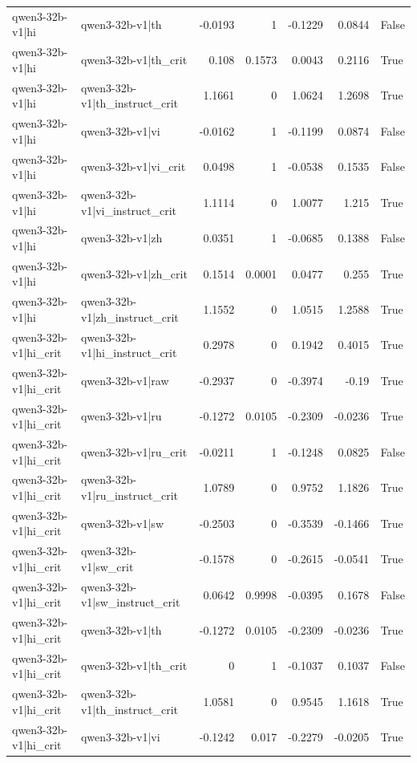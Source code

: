 \begin{table}
\begin{tabular}{l l r r r r l}
qwen3-32b-v1|hi & qwen3-32b-v1|th & -0.0193 & 1 & -0.1229 & 0.0844 & False \\
qwen3-32b-v1|hi & qwen3-32b-v1|th_crit & 0.108 & 0.1573 & 0.0043 & 0.2116 & True \\
qwen3-32b-v1|hi & qwen3-32b-v1|th_instruct_crit & 1.1661 & 0 & 1.0624 & 1.2698 & True \\
qwen3-32b-v1|hi & qwen3-32b-v1|vi & -0.0162 & 1 & -0.1199 & 0.0874 & False \\
qwen3-32b-v1|hi & qwen3-32b-v1|vi_crit & 0.0498 & 1 & -0.0538 & 0.1535 & False \\
qwen3-32b-v1|hi & qwen3-32b-v1|vi_instruct_crit & 1.1114 & 0 & 1.0077 & 1.215 & True \\
qwen3-32b-v1|hi & qwen3-32b-v1|zh & 0.0351 & 1 & -0.0685 & 0.1388 & False \\
qwen3-32b-v1|hi & qwen3-32b-v1|zh_crit & 0.1514 & 0.0001 & 0.0477 & 0.255 & True \\
qwen3-32b-v1|hi & qwen3-32b-v1|zh_instruct_crit & 1.1552 & 0 & 1.0515 & 1.2588 & True \\
qwen3-32b-v1|hi_crit & qwen3-32b-v1|hi_instruct_crit & 0.2978 & 0 & 0.1942 & 0.4015 & True \\
qwen3-32b-v1|hi_crit & qwen3-32b-v1|raw & -0.2937 & 0 & -0.3974 & -0.19 & True \\
qwen3-32b-v1|hi_crit & qwen3-32b-v1|ru & -0.1272 & 0.0105 & -0.2309 & -0.0236 & True \\
qwen3-32b-v1|hi_crit & qwen3-32b-v1|ru_crit & -0.0211 & 1 & -0.1248 & 0.0825 & False \\
qwen3-32b-v1|hi_crit & qwen3-32b-v1|ru_instruct_crit & 1.0789 & 0 & 0.9752 & 1.1826 & True \\
qwen3-32b-v1|hi_crit & qwen3-32b-v1|sw & -0.2503 & 0 & -0.3539 & -0.1466 & True \\
qwen3-32b-v1|hi_crit & qwen3-32b-v1|sw_crit & -0.1578 & 0 & -0.2615 & -0.0541 & True \\
qwen3-32b-v1|hi_crit & qwen3-32b-v1|sw_instruct_crit & 0.0642 & 0.9998 & -0.0395 & 0.1678 & False \\
qwen3-32b-v1|hi_crit & qwen3-32b-v1|th & -0.1272 & 0.0105 & -0.2309 & -0.0236 & True \\
qwen3-32b-v1|hi_crit & qwen3-32b-v1|th_crit & 0 & 1 & -0.1037 & 0.1037 & False \\
qwen3-32b-v1|hi_crit & qwen3-32b-v1|th_instruct_crit & 1.0581 & 0 & 0.9545 & 1.1618 & True \\
qwen3-32b-v1|hi_crit & qwen3-32b-v1|vi & -0.1242 & 0.017 & -0.2279 & -0.0205 & True \\

\end{tabular}
\end{table}
